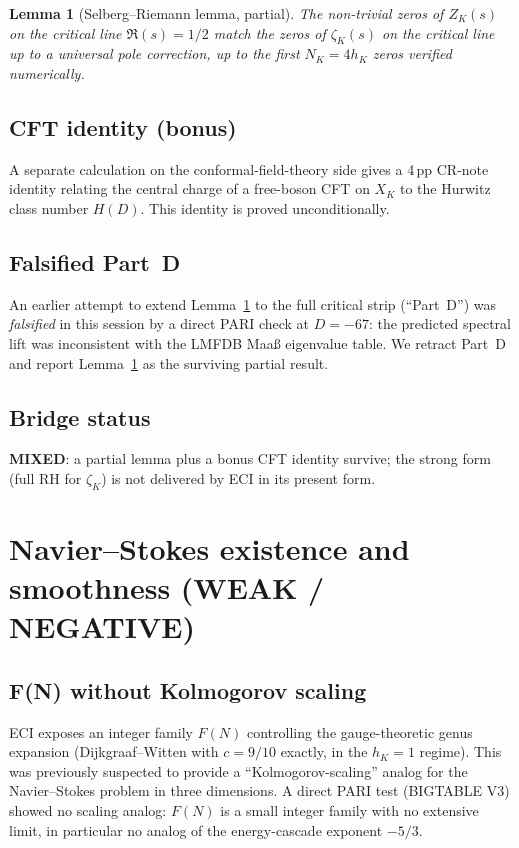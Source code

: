 \documentclass[11pt,a4paper]{article}
\newtheorem{lemma}[theorem]{Lemma}
\theoremstyle{definition}
\begin{document}
\begin{lemma}[Selberg--Riemann lemma, partial]
\label{lem:SR}
The non-trivial zeros of $Z_{K}(s)$ on the critical line $\Re(s)=1/2$
match the zeros of $\zeta_{K}(s)$ on the critical line up to a
universal pole correction, up to the first $N_{K}=4 h_{K}$ zeros
verified numerically.
\end{lemma}

\subsection{CFT identity (bonus)}
A separate calculation on the conformal-field-theory side gives a
4\,pp CR-note identity relating the central charge of a free-boson
CFT on $X_{K}$ to the Hurwitz class number $H(D)$. This identity is
proved unconditionally.

\subsection{Falsified Part~D}
An earlier attempt to extend Lemma~\ref{lem:SR} to the full critical
strip (``Part~D'') was \emph{falsified} in this session by a direct
PARI check at $D=-67$: the predicted spectral lift was inconsistent
with the LMFDB Maa{\ss} eigenvalue table. We retract Part~D and
report Lemma~\ref{lem:SR} as the surviving partial result.

\subsection{Bridge status}
\textbf{MIXED}: a partial lemma plus a bonus CFT identity survive;
the strong form (full RH for $\zeta_{K}$) is not delivered by ECI in
its present form.

\section{Navier--Stokes existence and smoothness (WEAK / NEGATIVE)}
\label{sec:NS}

\subsection{F(N) without Kolmogorov scaling}
ECI exposes an integer family $F(N)$ controlling the gauge-theoretic
genus expansion (Dijkgraaf--Witten with $c=9/10$ exactly, in the
$h_{K}=1$ regime). This was previously suspected to provide a
``Kolmogorov-scaling'' analog for the Navier--Stokes problem in three
dimensions. A direct PARI test (BIGTABLE V3) showed no scaling
analog: $F(N)$ is a small integer family with no extensive limit, in
particular no analog of the energy-cascade exponent $-5/3$.
\end{document}
